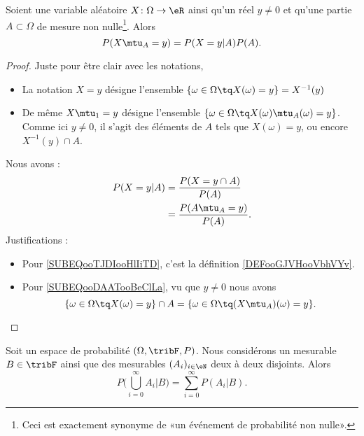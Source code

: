 \begin{lemma}
	Soient une variable aléatoire \( X\colon \Omega\to \eR\) ainsi qu'un réel \( y\neq 0\) et qu'une partie \( A\subset \Omega\) de mesure non nulle\footnote{Ceci est exactement synonyme de «un événement de probabilité non nulle».}. Alors
	\begin{equation}
		P(X\mtu_A=y)=P(X=y|A)P(A).
	\end{equation}
\end{lemma}

\begin{proof}
	Juste pour être clair avec les notations,
	\begin{itemize}
		\item La notation \( X=y\) désigne l'ensemble \( \{ \omega\in \Omega\tq X(\omega)=y \}=X^{-1}(y)\)
		\item
		      De même \( X\mtu_1=y\) désigne l'ensemble \( \{ \omega\in \Omega\tq X(\omega)\mtu_A(\omega)=y \}\). Comme ici \( y\neq 0\), il s'agit des éléments de \( A\) tels que \( X(\omega)=y\), ou encore \( X^{-1}(y)\cap A\).
	\end{itemize}
	Nous avons :
	\begin{subequations}
		\begin{align}
			P(X=y|A) & =\frac{ P(X=y\cap A) }{ P(A) }     \label{SUBEQooTJDIooHlIiTD}     \\
			         & =\frac{ P(A\mtu_A=y) }{ P(A) }.        \label{SUBEQooDAATooBeClLa}
		\end{align}
	\end{subequations}
	Justifications :
	\begin{itemize}
		\item Pour \eqref{SUBEQooTJDIooHlIiTD}, c'est la définition \ref{DEFooGJVHooVbhVYv}.
		\item Pour \eqref{SUBEQooDAATooBeClLa}, vu que \( y\neq 0\) nous avons
		      \begin{equation}
			      \{ \omega\in \Omega\tq X(\omega)=y \}\cap A=\{ \omega\in \Omega\tq (X\mtu_A)(\omega)=y \}.
		      \end{equation}
	\end{itemize}
\end{proof}

\begin{lemma}        \label{LEMooRDXRooQLMRGF}
	Soit un espace de probabilité \( (\Omega,\tribF,P)\). Nous considérons un mesurable \(B\in \tribF \) ainsi que des mesurables \( (A_i)_{i\in \eN}\) deux à deux disjoints. Alors
	\begin{equation}
		P\big( \bigcup_{i=0}^{\infty}A_i|B \big)=\sum_{i=0}^{\infty}P(A_i|B).
	\end{equation}
\end{lemma}

